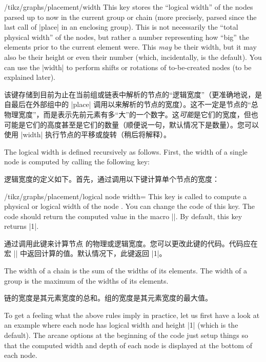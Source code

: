 \begin{key}{/tikz/graphs/placement/width}
    This key stores the ``logical width'' of the nodes parsed up to now in the
    current group or chain (more precisely, parsed since the last call of
    |place| in an enclosing group). This is not necessarily the ``total
    physical width'' of the nodes, but rather a number representing how ``big''
    the elements prior to the current element were. This \emph{may} be their
    width, but it may also be their height or even their number (which,
    incidentally, is the default). You can use the |width| to perform shifts or
    rotations of to-be-created nodes (to be explained later).

    该键存储到目前为止在当前组或链表中解析的节点的“逻辑宽度”（更准确地说，是自最后在外部组中的 |place| 调用以来解析的节点的宽度）。这不一定是节点的“总物理宽度”，而是表示先前元素有多“大”的一个数字。这\emph{可能}是它们的宽度，但也可能是它们的高度甚至是它们的数量（顺便说一句，默认情况下是数量）。您可以使用 |width| 执行节点的平移或旋转（稍后将解释）。

    The logical width is defined recursively as follows. First, the width of a
    single node is computed by calling the following key:

    逻辑宽度的定义如下。首先，通过调用以下键计算单个节点的宽度：

    \begin{key}{/tikz/graphs/placement/logical node width=}
        This key is called to compute a physical or logical width of the node
        . You can change the code of this key. The code
        should return the computed value in the macro |\pgfmathresult|. By
        default, this key returns |1|.

        通过调用此键来计算节点  的物理或逻辑宽度。您可以更改此键的代码。代码应在宏 |\pgfmathresult| 中返回计算的值。默认情况下，此键返回 |1|。

      \end{key}
    The width of a chain is the sum of the widths of its elements. The width of
    a group is the maximum of the widths of its elements.

    链的宽度是其元素宽度的总和。组的宽度是其元素宽度的最大值。

    To get a feeling what the above rules imply in practice, let us first have
    a look at an example where each node has logical width and height |1|
    (which is the default). The arcane options at the beginning of the code
    just setup things so that the computed width and depth of each node is
    displayed at the bottom of each node.


\end{key}

